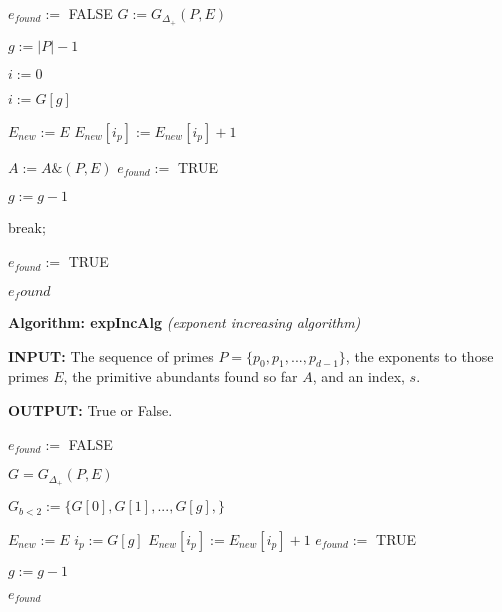 \documentclass[../paper.tex]{subfiles}
\begin{document}
\begin{algorithmic}

\STATE $e_{found} :=$ FALSE
\STATE $G := G_{ \Delta_{+}}(P,E)$

\STATE $g := |P| - 1$ %

\STATE $i := 0$ %

	\STATE $i := G[g]$


		\STATE {}
		\STATE $E_{new} := E$
		\STATE $E_{new}[ i_p ] := E_{new}[ i_p ] + 1 $
		
			\STATE $A := A\&(P,E)$
			\STATE $e_{found} := $ TRUE
		\ENDIF

		\STATE $g := g - 1$  
	
	\ELSE
		\STATE break;
	\ENDIF
\ENDWHILE


	\STATE {}
		\STATE $e_{found} := $ TRUE
	\ENDIF
\ENDIF

\RETURN $e_found$

\end{algorithmic}
{\setlength{\parindent}{0cm}

\textbf{Algorithm: expIncAlg}
\textit{(exponent increasing algorithm)}

\textbf{INPUT:} The sequence of primes 
$P = \{p_0, p_1, ..., p_{d-1}\}$, the exponents to those 
primes $E$, the primitive abundants found so far $A$, and an
index, $s$.

\textbf{OUTPUT:} True or False.
}
\begin{algorithmic}

\STATE $e_{found} :=$ FALSE

\STATE $G = G_{\Delta_+}(P,E)$

	\STATE $G_{b < 2} := \{G[0], G[1], 
	                       ..., G[g],\}$

		\STATE $E_{new} := E$	
		\STATE $i_p := G[g]$
		\STATE $E_{new}[i_p] := E_{new}[i_p] + 1$
			\STATE $e_{found} :=$ TRUE
		\ENDIF

	\STATE $g :=  g - 1$
	\ENDIF

\ENDWHILE

\RETURN $e_{found}$

\end{algorithmic}
\end{document}
